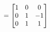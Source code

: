 \documentclass[preview]{standalone}
\begin{document}
\begin{align*}
\special{dvisvgm:raw <g id='unique000'>}
        = 
        \begin{bmatrix}
        1 & 0 & 0 \\
        0 & 1 & -1 \\
        0 & 1 & 1
        \end{bmatrix}
        \special{dvisvgm:raw </g>}
\end{align*}
\end{document}
